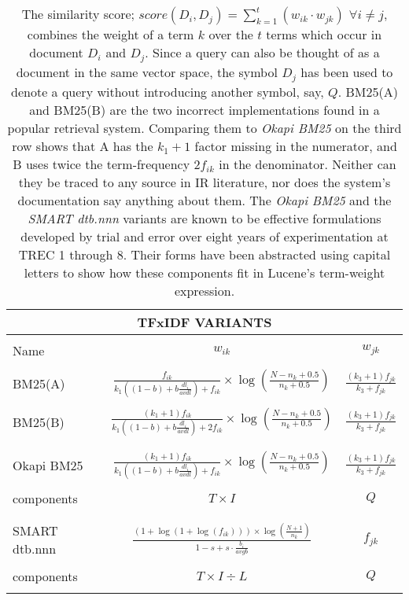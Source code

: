 \begin{table}[bht!]
  \centering
  \begin{tabular}{lcc}
    \multicolumn{3}{c}{TFxIDF VARIANTS}\\
    \hline\hline
    \\
    Name & $w_{ik}$ & $w_{jk}$\\
    \hline
    \\
    BM25(A)
    & $\frac{f_{ik}}{k_{1}((1-b)+b\frac{dl_{i}}{avdl})+f_{ik}} \times \log(\frac{N-n_{k}+0.5}{n_{k}+0.5})$
    & $\frac{(k_{3}+1)f_{jk}}{k_{3}+f_{jk}}$ \\
    \\
    BM25(B)
    & $\frac{(k_{1}+1)f_{ik}}{k_{1}((1-b)+b\frac{dl_{i}}{avdl})+2f_{ik}} \times \log(\frac{N-n_{k}+0.5}{n_{k}+0.5})$
    & $\frac{(k_{3}+1)f_{jk}}{k_{3}+f_{jk}}$ \\
    \\\hline
    \\
    Okapi BM25
    & $\frac{(k_{1}+1)f_{ik}}{k_{1}((1-b)+b\frac{dl_{i}}{avdl})+f_{ik}} \times \log(\frac{N-n_{k}+0.5}{n_{k}+0.5})$
    & $\frac{(k_{3}+1)f_{jk}}{k_{3}+f_{jk}}$ \\
    \\
    components & $T \times I$ & $Q$ \\
    \\\hline
    \\
    SMART dtb.nnn
    & $\frac{(1+\log(1+\log(f_{ik}))) \times \log(\frac{N+1}{n_{k}})}{1-s+s \cdot \frac{b_{i}}{avgb}}$
    & $f_{jk}$ \\
    \\
    components & $T \times I \div L$ & $Q$ \\
    \\\hline\hline
  \end{tabular}

  \caption{The similarity score;
    $score(D_{i},D_{j})=\sum_{k=1}^{t}(w_{ik} \cdot w_{jk})$ $\forall
    i \neq j$, combines the weight of a term $k$ over the $t$ terms
    which occur in document $D_{i}$ and $D_{j}$. Since a query can
    also be thought of as a document in the same vector space, the
    symbol $D_{j}$ has been used to denote a query without introducing
    another symbol, say, $Q$. BM25(A) and BM25(B) are the two
    incorrect implementations found in a popular retrieval
    system. Comparing them to \emph{Okapi BM25} on the third row shows
    that A has the $k_{1}+1$ factor missing in the numerator, and B
    uses twice the term-frequency $2f_{ik}$ in the
    denominator. Neither can they be traced to any source in IR
    literature, nor does the system's documentation say anything about
    them. The \emph{Okapi BM25} and the \emph{SMART dtb.nnn} variants
    are known to be effective formulations developed by trial and
    error over eight years of experimentation at TREC 1 through
    8. Their forms have been abstracted using capital letters to show
    how these components fit in Lucene's term-weight expression.}
  
  \label{tab:tfxidf}

\end{table}


